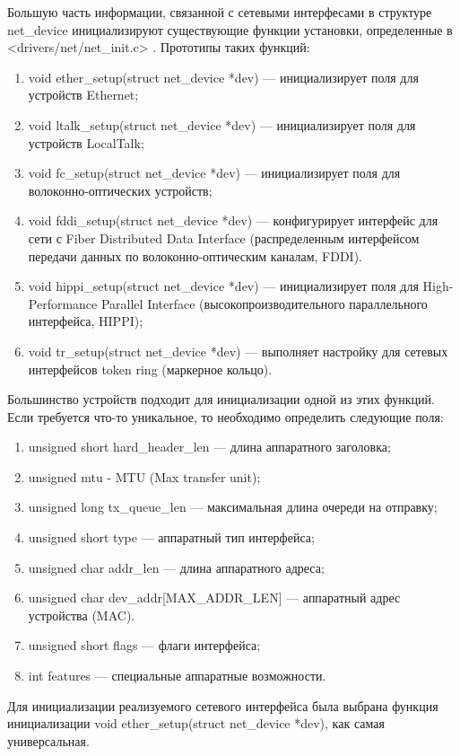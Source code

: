 \documentclass[14pt, a4paper]{extarticle}
\begin{document}
Большую часть информации, связанной с сетевыми интерфесами в структуре net\_device инициализируют существующие функции установки, определенные в <drivers/net/net\_init.c> \cite{ldd-orig}. Прототипы таких функций:
\begin{enumerate}
	\item void ether\_setup(struct net\_device *dev) --- инициализирует поля для устройств Ethernet;
	\item void ltalk\_setup(struct net\_device *dev) --- инициализирует поля для устройств LocalTalk;
	\item void fc\_setup(struct net\_device *dev) --- инициализирует поля для волоконно-оптических устройств;
	\item void fddi\_setup(struct net\_device *dev) --- конфигурирует интерфейс для сети с Fiber Distributed Data Interface (распределенным интерфейсом передачи данных по волоконно-оптическим каналам, FDDI).
	\item void hippi\_setup(struct net\_device *dev) --- инициализирует поля для High-Performance Parallel Interface (высокопроизводительного параллельного интерфейса, HIPPI);
	\item void tr\_setup(struct net\_device *dev) --- выполняет настройку для сетевых интерфейсов token ring (маркерное кольцо).
\end{enumerate}
\indent \indent Большинство устройств подходит для инициализации одной из этих функций. Если требуется что-то уникальное, то необходимо определить следующие поля:
\begin{enumerate}
	\item unsigned short hard\_header\_len --- длина аппаратного заголовка;
	\item unsigned mtu - MTU (Max transfer unit);
	\item unsigned long tx\_queue\_len --- максимальная длина очереди на отправку;
	\item unsigned short type --- аппаратный тип интерфейса;
	\item unsigned char addr\_len --- длина аппаратного адреса;
	\item unsigned char dev\_addr[MAX\_ADDR\_LEN] --- аппаратный адрес устройства (MAC).
	\item unsigned short flags --- флаги интерфейса;
	\item int features --- специальные аппаратные возможности.
\end{enumerate}

Для инициализации реализуемого сетевого интерфейса была выбрана функция инициализации void ether\_setup(struct net\_device *dev), как самая универсальная.
\end{document}
